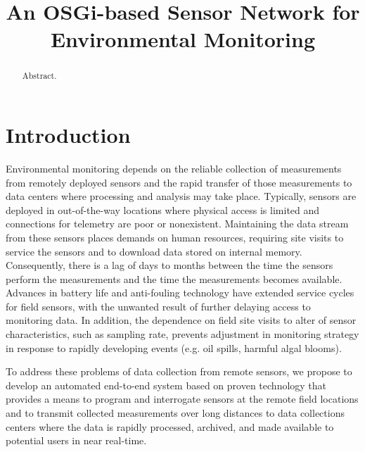 \documentclass[conference]{IEEEtran}
\begin{document}
\title{An OSGi-based Sensor Network for \\ Environmental Monitoring}

\author{
}


\maketitle
\begin{abstract}
  Abstract.
\end{abstract}


\section{Introduction}

Environmental monitoring depends on the reliable collection of
measurements from remotely deployed sensors and the rapid transfer of
those measurements to data centers where processing and analysis may
take place. Typically, sensors are deployed in out-of-the-way
locations where physical access is limited and connections for
telemetry are poor or nonexistent.   Maintaining the data stream from
these sensors places demands on human resources, requiring site visits
to service the sensors and to download data stored on internal memory.
Consequently, there is a lag of days to months between the time the
sensors perform the measurements and the time the measurements becomes
available.   Advances in battery life and anti-fouling technology have
extended service cycles for field sensors, with the unwanted result of
further delaying access to monitoring data.  In addition, the
dependence on field site visits to alter of sensor characteristics,
such as sampling rate, prevents adjustment in monitoring strategy in
response to rapidly developing events (e.g. oil spills, harmful algal
blooms).

To address these problems of data collection from remote
sensors, we propose to develop an automated end-to-end system based on
proven technology that provides a means to program and interrogate
sensors at the remote field locations and to transmit collected
measurements over long distances to data collections centers where the
data is rapidly processed, archived, and made available to potential
users in near real-time.
\end{document}
